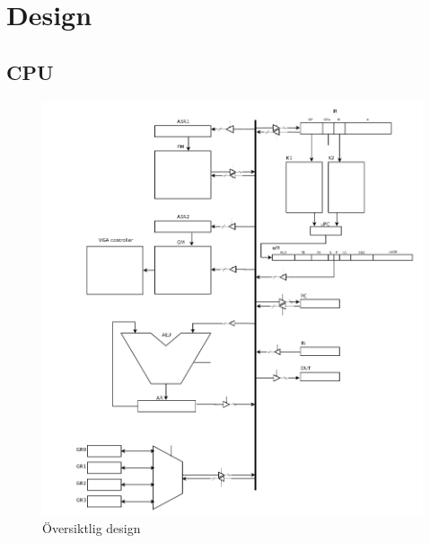 \section{Design}
\subsection{CPU}
\begin{center}
\begin{figure}[H]
    \centering
\includegraphics[scale=0.40]{../grafik/overall_design.png}
\caption{Översiktlig design}
\label{fig:gui}
\end{figure}
\end{center}


